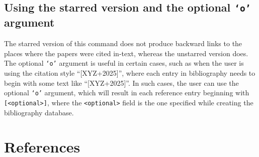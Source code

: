 \documentclass[letter, 11pt]{article}
\begin{document}
  \subsection*{Using the starred version and the optional \texttt{`o'} argument}
  The starred version of this command does not produce backward links to the places where the papers were cited in-text, whereas the unstarred version does. The optional \texttt{`o'} argument is useful in certain cases, such as when the user is using the citation style ``[XYZ+2025]'', where each entry in bibliography needs to begin with some text like ``[XYZ+2025]''. In such cases, the user can use the optional \texttt{`o'} argument, which will result in each reference entry beginning with \texttt{[<optional>]}, where the \texttt{<optional>} field is the one specified while creating the bibliography database.
  \section*{References}
  \dumbibCreateBibliography
\end{document}
